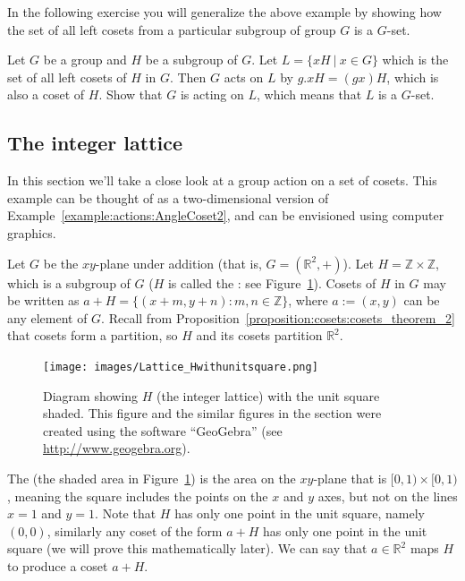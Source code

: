 In the following exercise you will generalize the above example by showing how the set of all left cosets from a particular subgroup of group $G$ is a $G$-set.

\begin{exercise}\label{exercise:actions:Action5}
Let $G$ be a group and $H$ be a subgroup of $G$. Let $L=\{xH~|~x\in G \}$ which is the set of all left cosets of $H$ in $G$. Then $G$ acts on $L$ by $g.xH = (gx)H$, which is also a coset of $H$. Show that $G$ is acting on $L$, which means that $L$ is a $G$-set.
\end{exercise}


\subsection{The integer lattice}\label{subsec:lattice}

In this section we'll take a close look at a group action on a set of cosets.  This example can be thought of as a two-dimensional version of Example~\ref{example:actions:AngleCoset2}, and can be envisioned using computer graphics.


Let $G$ be the $xy$-plane under addition (that is, $G=(\mathbb {R}^2,+)$).  Let $H=\mathbb{Z}\times \mathbb{Z}$, which is a subgroup of $G$ ($H$ is called the : see Figure~\ref{fig:HwithUnitSquare}).
Cosets of $H$ in $G$ may be written as $a+H=\{(x+m, y+n):m,n \in\mathbb{ Z}\}$, where $a :=(x,y)$ can be any element of $G$. Recall from Proposition~\ref{proposition:cosets:cosets_theorem_2} that cosets form a partition, so $H$ and its cosets partition $\mathbb{R}^2$.

\begin{figure}[htpb]
\begin{center}
\texttt{[image: images/Lattice\_Hwithunitsquare.png]}
\caption{\label{fig:HwithUnitSquare}Diagram showing $H$ (the integer lattice) with the unit square shaded. This figure and the similar figures in the section were created using the software ``GeoGebra'' (see \url{http://www.geogebra.org}).  }
\end{center}
\end{figure}

The  (the shaded area in Figure~\ref{fig:HwithUnitSquare}) is the area on the $xy$-plane that is $[0,1) \times [0,1)$, meaning the square includes the points on the $x$ and $y$ axes, but not on the lines $x=1$ and $y=1$. Note that $H$ has only one point in the unit square, namely $(0,0)$, similarly any coset of the form $a+H$ has only one point in the unit square (we will prove this mathematically later). We can say that $a\in \mathbb{R}^2$ maps $H$ to produce a coset $a+H$.

